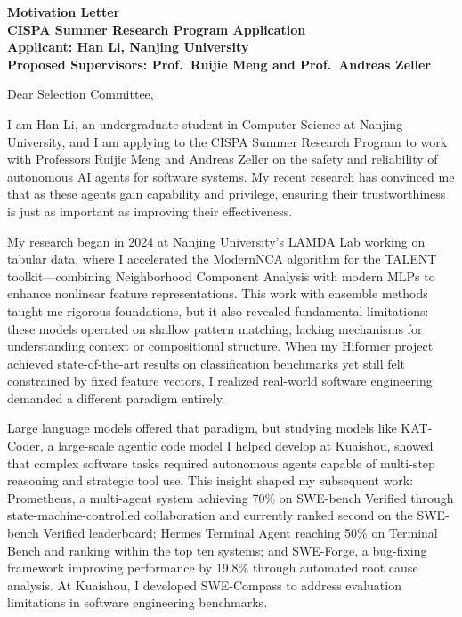 \documentclass[11pt,a4paper]{article}
\begin{document}
\begin{center}
    {\LARGE \textbf{Motivation Letter}}\\[0.5\baselineskip]
    {\large \textbf{CISPA Summer Research Program Application}}\\[0.5\baselineskip]
    \textbf{Applicant: Han Li, Nanjing University}\\
    \textbf{Proposed Supervisors: Prof.\ Ruijie Meng and Prof.\ Andreas Zeller}
\end{center}

\vspace{0.75\baselineskip}

Dear Selection Committee,

\vspace{0.75\baselineskip}

I am Han Li, an undergraduate student in Computer Science at Nanjing University, and I am applying to the CISPA Summer Research Program to work with Professors Ruijie Meng and Andreas Zeller on the safety and reliability of autonomous AI agents for software systems. My recent research has convinced me that as these agents gain capability and privilege, ensuring their trustworthiness is just as important as improving their effectiveness.

My research began in 2024 at Nanjing University's LAMDA Lab working on tabular data, where I accelerated the ModernNCA algorithm for the TALENT toolkit---combining Neighborhood Component Analysis with modern MLPs to enhance nonlinear feature representations. This work with ensemble methods taught me rigorous foundations, but it also revealed fundamental limitations: these models operated on shallow pattern matching, lacking mechanisms for understanding context or compositional structure. When my Hiformer project achieved state-of-the-art results on classification benchmarks yet still felt constrained by fixed feature vectors, I realized real-world software engineering demanded a different paradigm entirely.

Large language models offered that paradigm, but studying models like KAT-Coder, a large-scale agentic code model I helped develop at Kuaishou, showed that complex software tasks required autonomous agents capable of multi-step reasoning and strategic tool use. This insight shaped my subsequent work: Prometheus, a multi-agent system achieving 70\% on SWE-bench Verified through state-machine-controlled collaboration and currently ranked second on the SWE-bench Verified leaderboard; Hermes Terminal Agent reaching 50\% on Terminal Bench and ranking within the top ten systems; and SWE-Forge, a bug-fixing framework improving performance by 19.8\% through automated root cause analysis. At Kuaishou, I developed SWE-Compass to address evaluation limitations in software engineering benchmarks.
\end{document}
